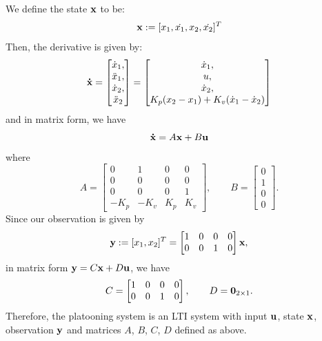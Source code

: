 \documentclass{homework}
\begin{document}
We define the state ${\bf x}$ to be:
\begin{equation}
    {\bf x} := [x_1, \dot{x_1}, x_2, \dot{x_2}]^T
\end{equation}
Then, the derivative is given by:
\begin{equation}
    {\bf \dot{x}} = \begin{bmatrix}
        \dot{x}_1, \\
        \ddot{x}_1, \\
        \dot{x}_2, \\
        \ddot{x}_2
    \end{bmatrix} = \begin{bmatrix}
        \dot{x}_1, \\
        u, \\
        \dot{x}_2, \\
        K_p(x_2 - x_1) + K_v (\dot{x}_1 - \dot{x}_2)
    \end{bmatrix}
\end{equation}
and in matrix form, we have
\begin{equation}
    {\bf \dot{x}} = A {\bf x} + B {\bf u}
\end{equation}
where
\begin{equation}
    A = \begin{bmatrix}
        0 & 1 & 0 & 0 \\
        0 & 0 & 0 & 0 \\
        0 & 0 & 0 & 1 \\
        -K_p & -K_v & K_p & K_v
    \end{bmatrix}, \qquad B = \begin{bmatrix}
        0 \\
        1 \\
        0 \\
        0
    \end{bmatrix}.
\end{equation}
Since our observation is given by 
\begin{equation}
    {\bf y} := [x_1, x_2]^T = \begin{bmatrix}
        1 & 0 & 0 & 0 \\
        0 & 0 & 1 & 0
    \end{bmatrix} {\bf x},
\end{equation}
in matrix form ${\bf y} = C {\bf x} + D {\bf u}$, we have
\begin{equation}
    C = \begin{bmatrix}
        1 & 0 & 0 & 0 \\
        0 & 0 & 1 & 0
    \end{bmatrix}, \qquad D = {\bf 0}_{2 \times 1}.
\end{equation}
Therefore, the platooning system is an LTI system with input ${\bf u}$, state ${\bf x}$,
observation ${\bf y}$ and matrices $A$, $B$, $C$, $D$ defined as above.
\end{document}
